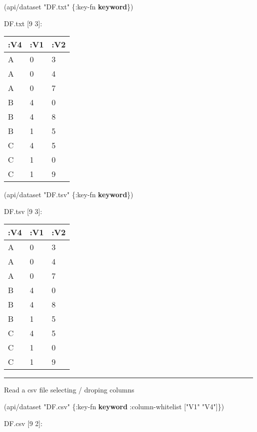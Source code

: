\documentclass[]{article}
\newenvironment{Shaded}{\begin{snugshade}}{\end{snugshade}}
\newcommand{\AttributeTok}[1]{\textcolor[rgb]{0.77,0.63,0.00}{#1}}
\newcommand{\KeywordTok}[1]{\textcolor[rgb]{0.13,0.29,0.53}{\textbf{#1}}}
\newcommand{\NormalTok}[1]{#1}
\newcommand{\StringTok}[1]{\textcolor[rgb]{0.31,0.60,0.02}{#1}}
\begin{document}
\begin{Shaded}
\begin{Highlighting}[]
\NormalTok{(api/dataset }\StringTok{"DF.txt"}\NormalTok{ \{}\AttributeTok{:key-fn} \KeywordTok{keyword}\NormalTok{\})}
\end{Highlighting}
\end{Shaded}

DF.txt {[}9 3{]}:

\begin{longtable}[]{@{}lll@{}}
\toprule
:V4 & :V1 & :V2\tabularnewline
\midrule
\endhead
A & 0 & 3\tabularnewline
A & 0 & 4\tabularnewline
A & 0 & 7\tabularnewline
B & 4 & 0\tabularnewline
B & 4 & 8\tabularnewline
B & 1 & 5\tabularnewline
C & 4 & 5\tabularnewline
C & 1 & 0\tabularnewline
C & 1 & 9\tabularnewline
\bottomrule
\end{longtable}

\begin{Shaded}
\begin{Highlighting}[]
\NormalTok{(api/dataset }\StringTok{"DF.tsv"}\NormalTok{ \{}\AttributeTok{:key-fn} \KeywordTok{keyword}\NormalTok{\})}
\end{Highlighting}
\end{Shaded}

DF.tsv {[}9 3{]}:

\begin{longtable}[]{@{}lll@{}}
\toprule
:V4 & :V1 & :V2\tabularnewline
\midrule
\endhead
A & 0 & 3\tabularnewline
A & 0 & 4\tabularnewline
A & 0 & 7\tabularnewline
B & 4 & 0\tabularnewline
B & 4 & 8\tabularnewline
B & 1 & 5\tabularnewline
C & 4 & 5\tabularnewline
C & 1 & 0\tabularnewline
C & 1 & 9\tabularnewline
\bottomrule
\end{longtable}

\begin{center}\rule{0.5\linewidth}{0.5pt}\end{center}

Read a csv file selecting / droping columns

\begin{Shaded}
\begin{Highlighting}[]
\NormalTok{(api/dataset }\StringTok{"DF.csv"}\NormalTok{ \{}\AttributeTok{:key-fn} \KeywordTok{keyword}
                       \AttributeTok{:column-whitelist}\NormalTok{ [}\StringTok{"V1"} \StringTok{"V4"}\NormalTok{]\})}
\end{Highlighting}
\end{Shaded}

DF.csv {[}9 2{]}:
\end{document}

